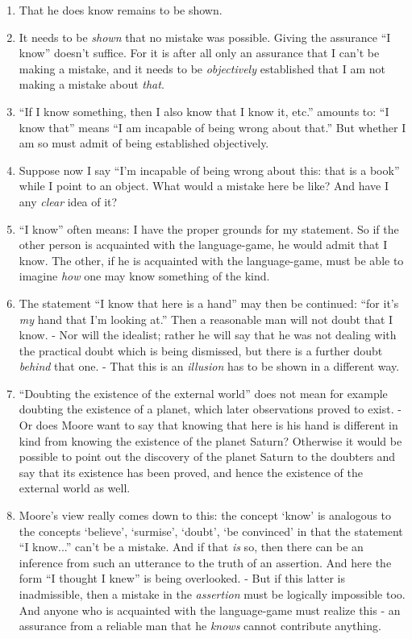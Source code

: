 \documentclass{book}
\begin{document}
\begin{enumerate}
\item
That he does know remains to be shown.

\item
It needs to be \emph{shown} that no mistake was possible. Giving the assurance
``I know'' doesn't suffice. For it is after all only an assurance that I can't
be making a mistake, and it needs to be \emph{objectively} established that I
am not making a mistake about \emph{that}.

\item
``If I know something, then I also know that I know it, etc.'' amounts to: ``I
know that'' means ``I am incapable of being wrong about that.'' But whether I
am so must admit of being established objectively.

\item
Suppose now I say ``I'm incapable of being wrong about this: that is a book''
while I point to an object. What would a mistake here be like? And have I any
\emph{clear} idea of it?

\item
``I know'' often means: I have the proper grounds for my statement. So if the
other person is acquainted with the language-game, he would admit that I know.
The other, if he is acquainted with the language-game, must be able to imagine
\emph{how} one may know something of the kind.

\item
The statement ``I know that here is a hand'' may then be continued: ``for it's
\emph{my} hand that I'm looking at.'' Then a reasonable man will not doubt that
I know. - Nor will the idealist; rather he will say that he was not dealing
with the practical doubt which is being dismissed, but there is a further doubt
\emph{behind} that one. - That this is an \emph{illusion} has to be shown in a
different way.

\item
``Doubting the existence of the external world'' does not mean for example
doubting the existence of a planet, which later observations proved to exist. -
Or does Moore want to say that knowing that here is his hand is different in
kind from knowing the existence of the planet Saturn? Otherwise it would be
possible to point out the discovery of the planet Saturn to the doubters and
say that its existence has been proved, and hence the existence of the external
world as well.

\item
Moore's view really comes down to this: the concept `know' is analogous to the
concepts `believe', `surmise', `doubt', `be convinced' in that the statement
``I know...'' can't be a mistake. And if that \emph{is} so, then there can be
an inference from such an utterance to the truth of an assertion. And here the
form ``I thought I knew'' is being overlooked. - But if this latter is
inadmissible, then a mistake in the \emph{assertion} must be logically
impossible too.  And anyone who is acquainted with the language-game must
realize this - an assurance from a reliable man that he \emph{knows} cannot
contribute anything.


\end{enumerate}
\end{document}
